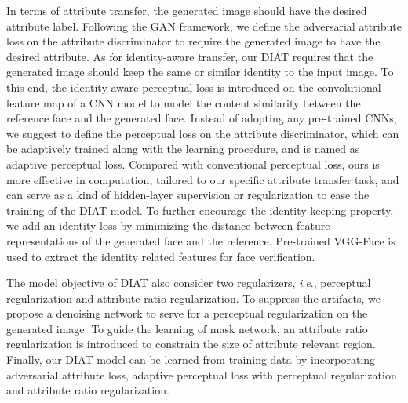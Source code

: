 \documentclass[journal]{IEEEtran}
\newcommand{\ie}{\textit{i}.\textit{e}.}
\begin{document}
In terms of attribute transfer, the generated image should have the desired attribute label.
Following the GAN framework, we define the adversarial attribute loss on the attribute discriminator to require the generated image to have the desired attribute.
As for identity-aware transfer, our DIAT requires that the generated image should keep the same or similar identity to the input image.
To this end, the identity-aware perceptual loss is introduced on the convolutional feature map of a CNN model to model the content similarity between the reference face and the generated face.
Instead of adopting any pre-trained CNNs, we suggest to define the perceptual loss on the attribute discriminator, which can be adaptively trained along with the learning procedure, and is named as adaptive perceptual loss.
Compared with conventional perceptual loss, ours is more effective in computation, tailored to our specific attribute transfer task, and can serve as a kind of hidden-layer supervision \cite{lee2015deeply} or regularization to ease the training of the DIAT model.
To further encourage the identity keeping property, we add an identity loss by minimizing the distance between feature representations of the generated face and the reference. Pre-trained VGG-Face is used to extract the identity related features for face verification. 



The model objective of DIAT also consider two regularizers, \ie, perceptual regularization and attribute ratio regularization.
To suppress the artifacts, we propose a denoising network to serve for a perceptual regularization on the generated image.
To guide the learning of mask network, an attribute ratio regularization is introduced to constrain the size of attribute relevant region.
Finally, our DIAT model can be learned from training data by incorporating adversarial attribute loss, adaptive perceptual loss with perceptual regularization and attribute ratio regularization.
\end{document}
